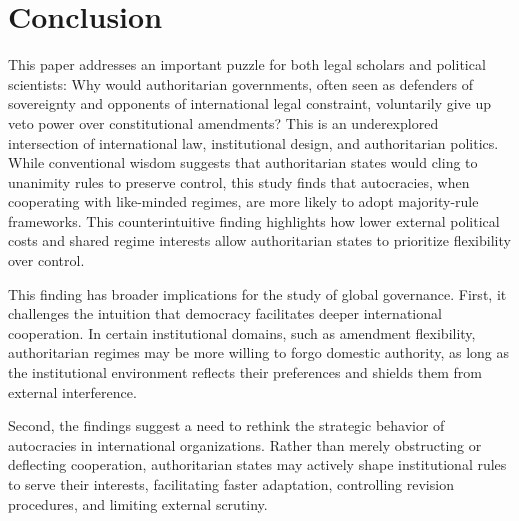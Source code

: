 \documentclass[12pt]{article}
\begin{document}
\section{Conclusion}

This paper addresses an important puzzle for both legal scholars and political scientists: Why would authoritarian governments, often seen as defenders of sovereignty and opponents of international legal constraint, voluntarily give up veto power over constitutional amendments? This is an underexplored intersection of international law, institutional design, and authoritarian politics. While conventional wisdom suggests that authoritarian states would cling to unanimity rules to preserve control, this study finds that autocracies, when cooperating with like-minded regimes, are more likely to adopt majority-rule frameworks. This counterintuitive finding highlights how lower external political costs and shared regime interests allow authoritarian states to prioritize flexibility over control. 

This finding has broader implications for the study of global governance. First, it challenges the intuition that democracy facilitates deeper international cooperation. In certain institutional domains, such as amendment flexibility, authoritarian regimes may be more willing to forgo domestic authority, as long as the institutional environment reflects their preferences and shields them from external interference.

Second, the findings suggest a need to rethink the strategic behavior of autocracies in international organizations. Rather than merely obstructing or deflecting cooperation, authoritarian states may actively shape institutional rules to serve their interests, facilitating faster adaptation, controlling revision procedures, and limiting external scrutiny.
\end{document}
